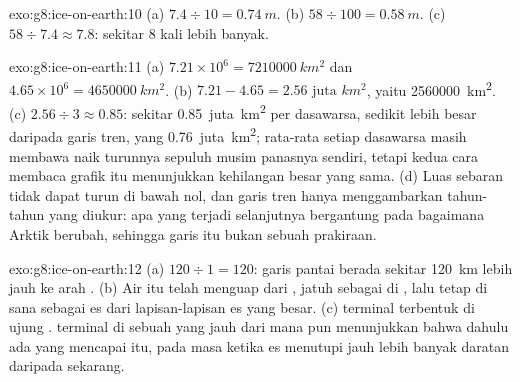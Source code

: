 \begin{solution}{exo:g8:ice-on-earth:10}
(a) $7.4 \div 10 = \qty{0.74}{m}$. (b) $58 \div 100 = \qty{0.58}{m}$.
(c) $58 \div 7.4 \approx 7.8$: sekitar 8 kali lebih banyak.
\end{solution}

\begin{solution}{exo:g8:ice-on-earth:11}
(a) $7.21 \times 10^6 = \qty{7210000}{km^2}$ dan $4.65 \times 10^6 =
\qty{4650000}{km^2}$. (b) $7.21 - 4.65 = \num{2.56}\text{ juta }\unit{km^2}$,
yaitu \qty{2560000}{km^2}. (c) $2.56 \div 3 \approx 0.85$: sekitar
\num{0.85}~juta~\unit{km^2} per dasawarsa, sedikit lebih besar daripada
garis tren, yang \num{0.76}~juta~\unit{km^2}; rata-rata setiap dasawarsa
masih membawa naik turunnya sepuluh musim panasnya sendiri, tetapi kedua
cara membaca grafik itu menunjukkan kehilangan besar yang sama. (d) Luas
sebaran tidak dapat turun di bawah nol, dan garis tren hanya menggambarkan
tahun-tahun yang diukur: apa yang terjadi selanjutnya bergantung pada
bagaimana  Arktik berubah, sehingga garis itu bukan sebuah
prakiraan.
\end{solution}

\begin{solution}{exo:g8:ice-on-earth:12}
(a) $120 \div 1 = 120$: garis pantai berada sekitar \qty{120}{km} lebih
jauh ke arah . (b) Air itu telah menguap dari , jatuh sebagai
 di , lalu tetap di sana sebagai es dari lapisan-lapisan es
yang besar. (c)  terminal terbentuk di ujung . 
terminal di sebuah  yang jauh dari  mana pun menunjukkan
bahwa dahulu ada  yang mencapai  itu, pada masa ketika es
menutupi jauh lebih banyak daratan daripada sekarang.
\end{solution}

